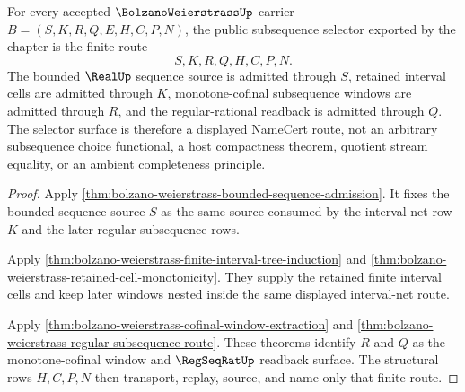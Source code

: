 \begin{theorem}
\label{thm:bolzano-weierstrass-public-subsequence-selector}
For every accepted $\BolzanoWeierstrassUp$ carrier $B=(S,K,R,Q,E,H,C,P,N)$, the public subsequence selector exported by the chapter is the finite route
$$
S,K,R,Q,H,C,P,N .
$$
The bounded $\RealUp$ sequence source is admitted through $S$, retained interval cells are admitted through $K$, monotone-cofinal subsequence windows are admitted through $R$, and the regular-rational readback is admitted through $Q$. The selector surface is therefore a displayed NameCert route, not an arbitrary subsequence choice functional, a host compactness theorem, quotient stream equality, or an ambient completeness principle.
\end{theorem}
\begin{proof}
Apply \autoref{thm:bolzano-weierstrass-bounded-sequence-admission}. It fixes the bounded sequence source $S$ as the same source consumed by the interval-net row $K$ and the later regular-subsequence rows.

Apply \autoref{thm:bolzano-weierstrass-finite-interval-tree-induction} and \autoref{thm:bolzano-weierstrass-retained-cell-monotonicity}. They supply the retained finite interval cells and keep later windows nested inside the same displayed interval-net route.

Apply \autoref{thm:bolzano-weierstrass-cofinal-window-extraction} and \autoref{thm:bolzano-weierstrass-regular-subsequence-route}. These theorems identify $R$ and $Q$ as the monotone-cofinal window and $\RegSeqRatUp$ readback surface. The structural rows $H,C,P,N$ then transport, replay, source, and name only that finite route.
\end{proof}

